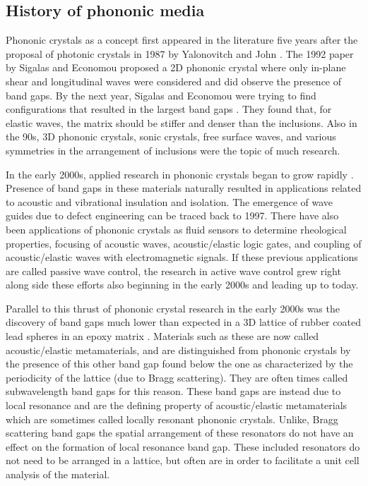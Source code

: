 \documentclass{article}
\begin{document}
\subsection{History of phononic media}
Phononic crystals as a concept first appeared in the literature five years 
after the proposal of photonic crystals in 1987 by Yalonovitch and John 
\cite{hussein14}. The 1992 paper by Sigalas and Economou \cite{sigalas92} 
proposed a 2D phononic 
crystal where only in-plane shear and longitudinal waves were considered and 
did observe the presence of band gaps. By the next year, Sigalas and Economou 
were trying to find configurations that resulted in the largest band gaps 
\cite{sigalas93}. They 
found that, for elastic waves, the matrix should be stiffer and denser than the 
inclusions. Also in the 90s, 3D phononic crystals, sonic crystals, free surface 
waves, and various symmetries in the arrangement of inclusions were the topic 
of much research. 

In the early 2000s, applied research in phononic crystals began to grow 
rapidly \cite{hussein14}. Presence of band gaps in these materials naturally 
resulted in 
applications related to acoustic and vibrational insulation and isolation. The 
emergence of wave guides due to defect engineering can be traced back to 1997. 
There have also been applications of phononic crystals as fluid 
sensors to determine rheological properties, focusing of acoustic waves, 
acoustic/elastic logic gates, and coupling of acoustic/elastic waves with 
electromagnetic signals. If these previous applications are called passive wave 
control, the research in active wave control grew right along side these 
efforts also beginning in the early 2000s and leading up to today.

Parallel to this thrust of phononic crystal research in the early 2000s was the 
discovery of band gaps much lower than expected in a 3D lattice of rubber 
coated lead spheres in an epoxy matrix \cite{liu00}. Materials such as these 
are now called 
acoustic/elastic metamaterials, and are distinguished from phononic crystals by 
the presence of this other band gap found below the one as characterized by the 
periodicity of the lattice (due to Bragg scattering). They are often times 
called subwavelength band gaps for this reason. These band gaps are instead due 
to local resonance and are the defining property of acoustic/elastic 
metamaterials which are sometimes called locally resonant phononic crystals. 
Unlike, Bragg scattering band gaps the spatial arrangement of these resonators 
do not have an effect on the formation of local resonance band gap. These 
included resonators do not need to be arranged in a lattice, but often are in 
order to facilitate a unit cell analysis of the material.
\end{document}
